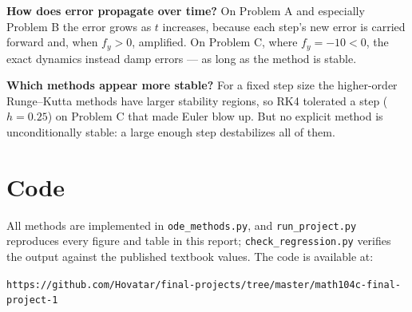 \documentclass[11pt]{article}
\begin{document}
\textbf{How does error propagate over time?} On Problem A and especially Problem
B the error grows as $t$ increases, because each step's new error is carried
forward and, when $f_y > 0$, amplified. On Problem C, where $f_y = -10 < 0$, the
exact dynamics instead damp errors --- as long as the method is stable.

\textbf{Which methods appear more stable?} For a fixed step size the higher-order
Runge--Kutta methods have larger stability regions, so RK4 tolerated a step
($h = 0.25$) on Problem C that made Euler blow up. But no explicit method is
unconditionally stable: a large enough step destabilizes all of them.

\section{Code}
\label{sec:code}
All methods are implemented in \texttt{ode\_methods.py}, and
\texttt{run\_project.py} reproduces every figure and table in this report;
\texttt{check\_regression.py} verifies the output against the published
textbook values. The code is available at:

\begin{center}
\texttt{https://github.com/Hovatar/final-projects/tree/master/math104c-final-project-1}
\end{center}
\end{document}
